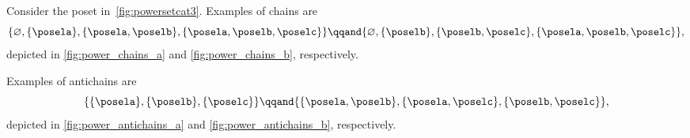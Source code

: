 \begin{example}
    Consider the poset in~\cref{fig:powersetcat3}.
    Examples of chains are
    \begin{equation*}
        \{\varnothing,\{\posela\},\{\posela,\poselb\},\{\posela,\poselb,\poselc\}\}
        \qqand
        \{\varnothing,\{\poselb\},\{\poselb,\poselc\},\{\posela,\poselb,\poselc\}\},
    \end{equation*}
    depicted in \cref{fig:power_chains_a} and \cref{fig:power_chains_b}, respectively.

    Examples of antichains are
    \begin{equation*}
        \{\{\posela\},\{\poselb\},\{\poselc\}\}
        \qqand
        \{ \{\posela,\poselb\},\{\posela,\poselc\}, \{\poselb,\poselc\}\},
    \end{equation*}
    depicted in \cref{fig:power_antichains_a} and \cref{fig:power_antichains_b}, respectively.
\end{example}

\begin{figure*}
\end{figure*}

\clearpage

